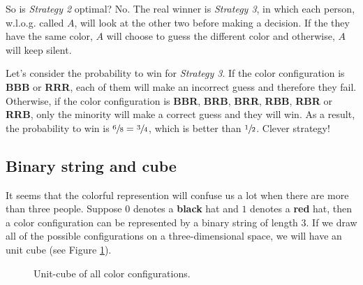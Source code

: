 \documentclass{scribe}
\begin{document}
So is \textit{Strategy 2} optimal? No. The real winner is \textit{Strategy 3}, in which each person, w.l.o.g. called $A$, will look at the other two before making a decision. If the they have the same color, $A$ will choose to guess the different color and otherwise, $A$ will keep silent.

Let's consider the probability to win for \textit{Strategy 3}. If the color configuration is \textbf{BBB} or \textbf{\color{red}RRR}, each of them will make an incorrect guess and therefore they fail. Otherwise, if the color configuration is \textbf{BB{\color{red}R}}, \textbf{B{\color{red}R}B}, \textbf{B{\color{red}R}{\color{red}R}}, \textbf{{\color{red}R}BB}, \textbf{{\color{red}R}B{\color{red}R}} or \textbf{{\color{red}R}{\color{red}R}B}, only the minority will make a correct guess and they will win. As a result, the probability to win is $\sfrac{6}{8} = \sfrac{3}{4}$, which is better than $\sfrac{1}{2}$. Clever strategy! 

\subsection{Binary string and cube}
\label{sec:color-configuration}

It seems that the colorful represention will confuse us a lot when there are more than three people. Suppose $0$ denotes a \textbf{black} hat and $1$ denotes a \textbf{\color{red}red} hat, then a color configuration can be represented by a binary string of length $3$. If we draw all of the possible configurations on a three-dimensional space, we will have an unit cube (see Figure \ref{unit-cube}).

\begin{figure}[htb]
  \centering
  \caption{Unit-cube of all color configurations.}\label{unit-cube}
\end{figure}
\end{document}
